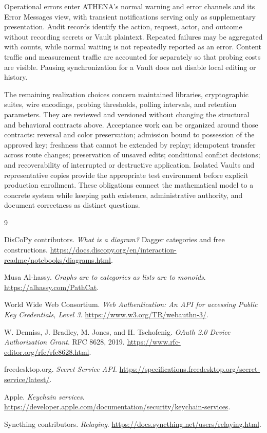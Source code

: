 \documentclass[11pt,a4paper]{article}
\theoremstyle{definition}
\theoremstyle{plain}
\begin{document}
Operational errors enter ATHENA's normal warning and error channels
and its Error Messages view, with transient notifications serving only
as supplementary presentation. Audit records identify the action,
request, actor, and outcome without recording secrets or Vault plaintext.
Repeated failures may be aggregated with counts, while normal waiting
is not repeatedly reported as an error. Content traffic and measurement
traffic are accounted for separately so that probing costs are visible.
Pausing synchronization for a Vault does not disable local editing or
history.

The remaining realization choices concern maintained libraries,
cryptographic suites, wire encodings, probing thresholds, polling
intervals, and retention parameters. They are reviewed and versioned
without changing the structural and behavioral contracts above.
Acceptance work can be organized around those contracts: reversal and
color preservation; admission bound to possession of the approved key;
freshness that cannot be extended by replay; idempotent transfer across
route changes; preservation of unsaved edits; conditional conflict
decisions; and recoverability of interrupted or destructive application.
Isolated Vaults and representative copies provide the appropriate test
environment before explicit production enrollment. These obligations
connect the mathematical model to a concrete system while keeping
path existence, administrative authority, and document correctness as
distinct questions.

\begin{thebibliography}{9}
\raggedright

DisCoPy contributors.
\emph{What is a diagram?} Dagger categories and free constructions.
\url{https://docs.discopy.org/en/interaction-readme/notebooks/diagrams.html}.

Musa Al-hassy.
\emph{Graphs are to categories as lists are to monoids}.
\url{https://alhassy.com/PathCat}.

World Wide Web Consortium.
\emph{Web Authentication: An API for accessing Public Key Credentials,
Level 3}.
\url{https://www.w3.org/TR/webauthn-3/}.

W. Denniss, J. Bradley, M. Jones, and H. Tschofenig.
\emph{OAuth 2.0 Device Authorization Grant}.
RFC 8628, 2019.
\url{https://www.rfc-editor.org/rfc/rfc8628.html}.

freedesktop.org.
\emph{Secret Service API}.
\url{https://specifications.freedesktop.org/secret-service/latest/}.

Apple.
\emph{Keychain services}.
\url{https://developer.apple.com/documentation/security/keychain-services}.

Syncthing contributors.
\emph{Relaying}.
\url{https://docs.syncthing.net/users/relaying.html}.

\end{thebibliography}
\end{document}
